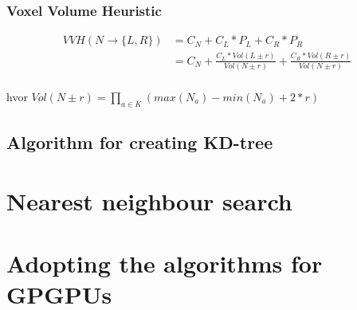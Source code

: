 

\subsubsection{Voxel Volume Heuristic}


\begin{displaymath}
  \begin{array}{rl}
    VVH(N \rightarrow \{L, R\}) &= C_N + C_L * P_L + C_R * P_R \\
    &= C_N + \frac{C_L * Vol(L \pm r)}{Vol(N \pm r)} + 
    \frac{C_R * Vol(R \pm r)}{Vol(N \pm r)} \\
  \end{array}
\end{displaymath}

hvor $Vol(N \pm r) = \prod_{a \in K} (max(N_a) - min(N_a) + 2 * r)$



\subsection{Algorithm for creating KD-tree}




\section{Nearest neighbour search}







\section{Adopting the algorithms for GPGPUs}

